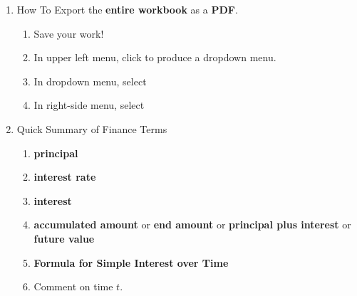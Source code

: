 \documentclass[12pt]{article}
\renewcommand{\emph}[1]{\textsf{\textbf{#1}}}
\newcommand{\be}{\begin{enumerate}}
\newcommand{\ee}{\end{enumerate}}
\begin{document}
\begin{enumerate}
\begin{enumerate}
		\fbox{{\tt\vphantom{\large Bp}\hspace{1in}}} 
	\item Use the pull down feature to determine the Total in the savings account in 10 years. Write down your steps. \\
	\vfill
	\item How long will it take for the savings account to double in value? Write down your steps. \\
	\vfill
	\item How can you calculate the Total in the savings account in 50 years \emph{without} using the pull down feature? Then check your calculation using the pull down feature. \\
	\vfill
	\item If $P$ is the principal, $r$ is the interest rate, $t$ is the number of years, and $A$ is the accumulated amount of money in the savings account, write a formula for $A$ and check your answer.
	\vfill
	\end{enumerate}
\newpage
\item How To Export the \emph{entire workbook} as a \emph{PDF}.
	\begin{enumerate}
	\item Save your work!
	\item In upper left menu, click  to produce a dropdown menu.
	\item In dropdown menu, select 
	\item In right-side menu, select 
	\end{enumerate}
	\vfill
\item Quick Summary of Finance Terms

	\be
	\item \emph{principal}


	\vfill	
	\item \emph{interest rate}


		\vfill
	\item \emph{interest}


		\vfill

	\item \emph{accumulated amount} or  \emph{end amount} or \emph{principal plus interest} or \emph{future value}
	
		\vfill	
	\item \emph{Formula for Simple Interest over Time}
	
		\vfill
	
	\item Comment on time $t$.\\
		\vfill
	\ee


\end{enumerate}
\end{document}
